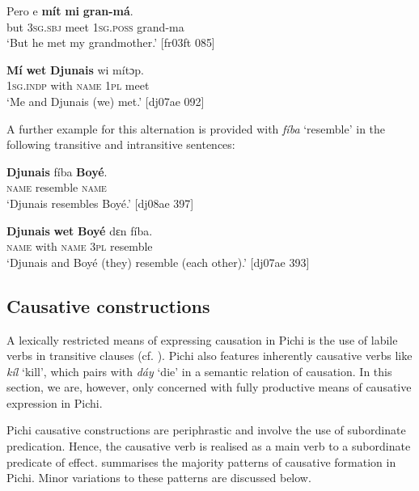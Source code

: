 \ea%
    \label{ex:key:1315}
    \gll Pero    e    \textbf{mít}    \textbf{mi}    \textbf{gran-má}.\\
but    \textsc{3sg.sbj}  meet  \textsc{1sg.poss}  grand-ma\\

\glt ‘But he met my grandmother.’ [fr03ft 085]
\z


\ea%
    \label{ex:key:1316}
    \gll \textbf{Mí}    \textbf{wet}    \textbf{Djunais}  wi  mítɔp.\\
\textsc{1sg.indp}  with    \textsc{name}  \textsc{1pl}  meet\\

\glt ‘Me and Djunais (we) met.’ [dj07ae 092]
\z

A further example for this alternation is provided with \textit{fíba} ‘resemble’ in the following transitive and intransitive sentences:


\ea%
    \label{ex:key:1317}
    \gll \textbf{Djunais}  fíba      \textbf{Boyé}.\\
\textsc{name}  resemble    \textsc{name}\\

\glt ‘Djunais resembles Boyé.’ [dj08ae 397]
\z


\ea%
    \label{ex:key:1318}
    \gll \textbf{Djunais}  \textbf{wet}    \textbf{Boyé}  dɛn  fíba.\\
\textsc{name}  with    \textsc{name}  \textsc{3pl}  resemble\\

\glt ‘Djunais and Boyé (they) resemble (each other).’ [dj07ae 393]
\z

\subsection{Causative constructions}\label{sec:9.4.4}

A lexically restricted means of expressing causation in Pichi is the use of labile verbs in transitive clauses (cf. ). Pichi also features inherently causative verbs like \textit{kíl} ‘kill’, which pairs with \textit{dáy} ‘die’ in a semantic relation of causation. In this section, we are, however, only concerned with fully productive means of causative expression in Pichi. 


Pichi causative constructions are periphrastic and involve the use of subordinate predication. Hence, the causative verb is realised as a main verb to a subordinate predicate of effect.  summarises the majority patterns of causative formation in Pichi. Minor variations to these patterns are discussed below.


